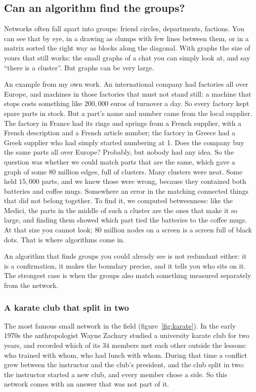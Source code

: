 \documentclass[12pt, a4paper]{article}
\theoremstyle{definition}
\theoremstyle{remark}
\begin{document}
\subsection{Can an algorithm find the groups?}
\label{sec:finding-groups}
Networks often fall apart into groups: friend circles, departments, factions. You can see that by eye, in a drawing as clumps with few lines between them, or in a matrix sorted the right way as blocks along the diagonal. With graphs the size of yours that still works: the small graphs of a chat you can simply look at, and say ``there is a cluster''. But graphs can be very large.

An example from my own work. An international company had factories all over Europe, and machines in those factories that must not stand still: a machine that stops costs something like $200{,}000$ euros of turnover a day. So every factory kept spare parts in stock. But a part's name and number came from the local supplier. The factory in France had its rings and springs from a French supplier, with a French description and a French article number; the factory in Greece had a Greek supplier who had simply started numbering at 1. Does the company buy the same parts all over Europe? Probably, but nobody had any idea. So the question was whether we could match parts that are the same, which gave a graph of some $80$ million edges, full of clusters. Many clusters were neat. Some held $15{,}000$ parts, and we knew those were wrong, because they contained both batteries and coffee mugs. Somewhere an error in the matching connected things that did not belong together. To find it, we computed betweenness: like the Medici, the parts in the middle of such a cluster are the ones that make it so large, and finding them showed which part tied the batteries to the coffee mugs. At that size you cannot look; $80$ million nodes on a screen is a screen full of black dots. That is where algorithms come in.

An algorithm that finds groups you could already see is not redundant either: it is a confirmation, it makes the boundary precise, and it tells you who sits on it. The strongest case is when the groups also match something measured separately from the network.

\subsubsection{A karate club that split in two}
The most famous small network in the field (figure~\ref{fig:karate}). In the early 1970s the anthropologist Wayne Zachary studied a university karate club for two years, and recorded which of its $34$ members met each other outside the lessons: who trained with whom, who had lunch with whom. During that time a conflict grew between the instructor and the club's president, and the club split in two: the instructor started a new club, and every member chose a side. So this network comes with an answer that was not part of it.
\end{document}
